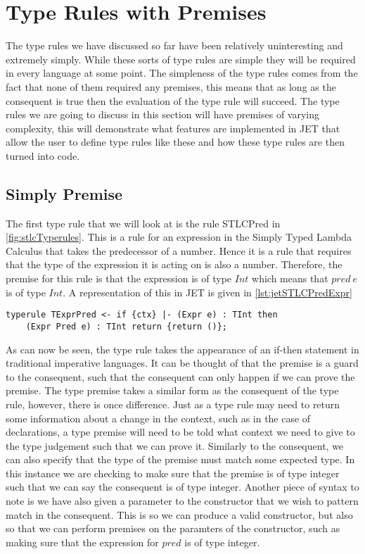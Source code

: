 \section{Type Rules with Premises}
The type rules we have discussed so far have been relatively uninteresting and extremely simply.
While these sorts of type rules are simple they will be required in every language at some point.
The simpleness of the type rules comes from the fact that none of them required any premises, this means that as long as the consequent is true then the evaluation of the type rule will succeed.
The type rules we are going to discuss in this section will have premises of varying complexity, this will demonstrate what features are implemented in JET that allow the user to define type rules like these and how these type rules are then turned into code.

\subsection{Simply Premise}
The first type rule that we will look at is the rule STLCPred in \autoref{fig:stlcTyperules}.
This is a rule for an expression in the Simply Typed Lambda Calculus that takes the predecessor of a number.
Hence it is a rule that requires that the type of the expression it is acting on is also a number.
Therefore, the premise for this rule is that the expression is of type $Int$ which means that $pred\ e$ is of type $Int$.
A representation of this in JET is given in \autoref{lst:jetSTLCPredExpr}

\begin{lstlisting}[caption = Type rule for pred expression involving one premise, label=lst:jetSTLCPredExpr]
typerule TExprPred <- if {ctx} |- (Expr e) : TInt then 
    (Expr Pred e) : TInt return {return ()};
\end{lstlisting}

As can now be seen, the type rule takes the appearance of an if-then statement in traditional imperative languages.
It can be thought of that the premise is a guard to the consequent, such that the consequent can only happen if we can prove the premise.
The type premise takes a similar form as the consequent of the type rule, however, there is once difference.
Just as a type rule may need to return some information about a change in the context, such as in the case of declarations, a type premise will need to be told what context we need to give to the type judgement such that we can prove it.
Similarly to the consequent, we can also specify that the type of the premise must match some expected type.
In this instance we are checking to make sure that the premise is of type integer such that we can say the consequent is of type integer.
Another piece of syntax to note is we have also given a parameter to the constructor that we wish to pattern match in the consequent.
This is so we can produce a valid constructor, but also so that we can perform premises on the paramters of the constructor, such as making sure that the expression for $pred$ is of type integer.

